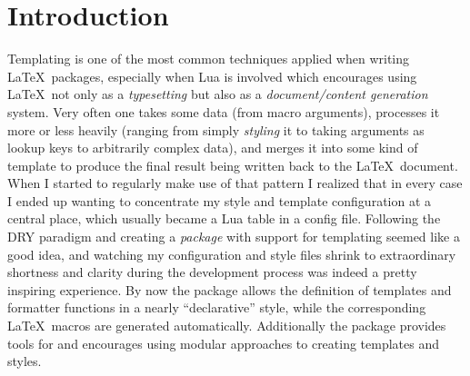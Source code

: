 \documentclass{scrartcl}
\title{\package{luatemplates}}
\subtitle{v0.8}
\author{Urs Liska}
\date{\today}
\begin{document}
\maketitle

\begin{abstract}

 is a package for Lua\LaTeX\ designed to assist package
and document authors with the recurring task of \emph{templating}.  Essentially
it eliminates the need to deal with the interfacing of the \LaTeX\ and Lua sides
of creating macros.  The package's main objectives are: maintaining  templates
and formatter functions in a central location, easily exposing them as \LaTeX\
macros, and assisting with a modular style of programming templates and styles.

\end{abstract}


\tableofcontents

\section{Introduction}

Templating is one of the most common techniques applied when writing \LaTeX\
packages, especially when Lua is involved which encourages using \LaTeX\ not
only as a \emph{typesetting} but also as a \emph{document/content generation}
system.  Very often one takes some data (from macro arguments), processes it
more or less heavily (ranging from simply \emph{styling} it to taking arguments
as lookup keys to arbitrarily complex data), and merges it into some kind of
template to produce the final result being written back to the \LaTeX\ document.
When I started to regularly make use of that pattern I realized that in every
case I ended up wanting to concentrate my style and template configuration at a
central place, which usually became a Lua table in a config file.  Following the
DRY paradigm and creating a \emph{package} with support for templating seemed
like a good idea, and watching my configuration and style files shrink to
extraordinary shortness and clarity during the development process was indeed a
pretty inspiring experience.  By now the package allows the definition of
templates and formatter functions in a nearly “declarative” style, while the
corresponding \LaTeX\ macros are generated automatically. Additionally the
package provides tools for and encourages using modular approaches to creating
templates and styles.
\end{document}

